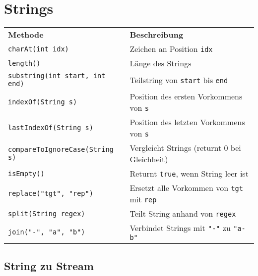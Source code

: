 \section{Strings}

\begin{tabular}{@{}l l@{}}
    \textbf{Methode} & \textbf{Beschreibung}\\\hhline{==}
    \lstinline|charAt(int idx)| & Zeichen an Position \lstinline|idx|\\\hhline{--}
    \lstinline|length()| & Länge des Strings\\\hhline{--}
    \lstinline|substring(int start, int end)| & Teilstring von \lstinline|start| bis \lstinline|end|\\\hhline{--}
    \lstinline|indexOf(String s)| & Position des ersten Vorkommens von \lstinline|s|\\\hhline{--}
    \lstinline|lastIndexOf(String s)| & Position des letzten Vorkommens von \lstinline|s|\\\hhline{--}
    \lstinline|compareToIgnoreCase(String s)| & Vergleicht Strings (returnt 0 bei Gleichheit)\\\hhline{--}
    \lstinline|isEmpty()| & Returnt \lstinline|true|, wenn String leer ist\\\hhline{--}
    \lstinline|replace("tgt", "rep")| & Ersetzt alle Vorkommen von \lstinline|tgt| mit \lstinline|rep|\\\hhline{--}
    \lstinline|split(String regex)| & Teilt String anhand von \lstinline|regex|\\\hhline{--}
    \lstinline|join("-", "a", "b")| & Verbindet Strings mit \lstinline|"-"| zu \lstinline|"a-b"|\\
\end{tabular}

\subsection{String zu Stream}

